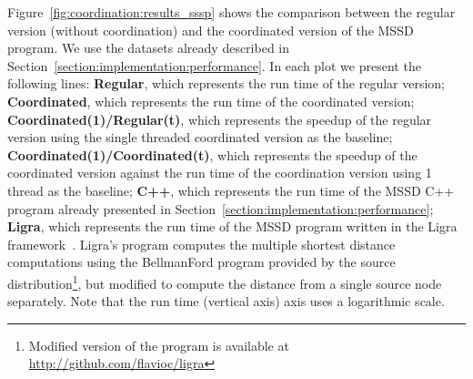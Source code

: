 \begin{table}[ht]
   \begin{center}
      
   \end{center}


   \label{table:coordination:sssp_stats}
\end{table}

Figure~\ref{fig:coordination:results_sssp} shows the comparison between the
regular version (without coordination) and the coordinated version of the MSSD
program. We use the datasets already described in
Section~\ref{section:implementation:performance}.  In each plot we present the
following lines: \textbf{Regular}, which represents the run time of the regular
version; \textbf{Coordinated}, which represents the run time of the coordinated
version; \textbf{Coordinated(1)/Regular(t)}, which represents the speedup of the
regular version using the single threaded coordinated version as the baseline;
\textbf{Coordinated(1)/Coordinated(t)}, which represents the speedup of the
coordinated version against the run time of the coordination version using 1 thread
as the baseline; \textbf{C++}, which represents the run time of the MSSD C++
program already presented in Section~\ref{section:implementation:performance};
\textbf{Ligra}, which represents the run time of the MSSD program written in the
Ligra framework~\cite{Shun:2013:LLG:2517327.2442530}. Ligra's program computes
the multiple shortest distance computations using the BellmanFord program
provided by the source distribution\footnote{Modified version of the program is
available at \url{http://github.com/flavioc/ligra}}, but modified to compute
the distance from a single source node separately.  Note that the run time
(vertical axis) axis uses a logarithmic scale.

